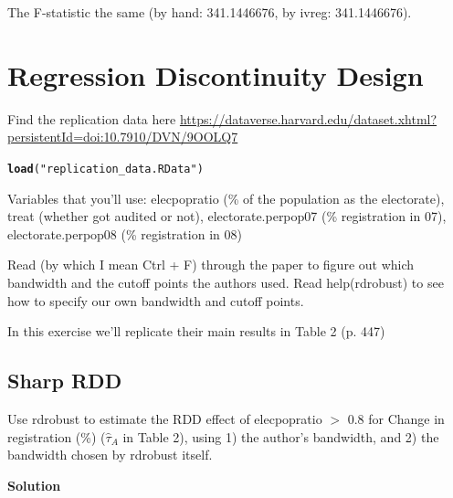 \documentclass{article}\usepackage[]{graphicx}\usepackage[]{color}
\makeatletter
\newcommand{\hlstr}[1]{\textcolor[rgb]{0.192,0.494,0.8}{#1}}%
\newcommand{\hlstd}[1]{\textcolor[rgb]{0.345,0.345,0.345}{#1}}%
\newcommand{\hlkwd}[1]{\textcolor[rgb]{0.737,0.353,0.396}{\textbf{#1}}}%
\newenvironment{kframe}{%
 \def\at@end@of@kframe{}%
 \ifinner\ifhmode%
  \def\at@end@of@kframe{\end{minipage}}%
  \begin{minipage}{\columnwidth}%
 \fi\fi%
 \def\FrameCommand##1{\hskip\@totalleftmargin \hskip-\fboxsep
 \colorbox{shadecolor}{##1}\hskip-\fboxsep
     \hskip-\linewidth \hskip-\@totalleftmargin \hskip\columnwidth}%
 \MakeFramed {\advance\hsize-\width
   \@totalleftmargin\z@ \linewidth\hsize
   \@setminipage}}%
 {\par\unskip\endMakeFramed%
 \at@end@of@kframe}
\newenvironment{knitrout}{}{} %
\makeatother
\begin{document}
The F-statistic the same (by hand: 341.1446676, by ivreg: 341.1446676).

\section{Regression Discontinuity Design}

Find the replication data here \url{https://dataverse.harvard.edu/dataset.xhtml?persistentId=doi:10.7910/DVN/9OOLQ7}

\begin{knitrout}
\color{fgcolor}\begin{kframe}
\begin{alltt}
\hlkwd{load}\hlstd{(}\hlstr{"replication_data.RData"}\hlstd{)}
\end{alltt}
\end{kframe}
\end{knitrout}

Variables that you'll use: elecpopratio (\% of the population as the electorate), treat (whether got audited or not), electorate.perpop07 (\% registration in 07), electorate.perpop08 (\% registration in 08)

Read (by which I mean Ctrl + F) through the paper to figure out which bandwidth and the cutoff points the authors used. Read help(rdrobust) to see how to specify our own bandwidth and cutoff points.

In this exercise we'll replicate their main results in Table 2 (p. 447)

\subsection{Sharp RDD}

Use rdrobust to estimate the RDD effect of elecpopratio $>$ 0.8 for Change in registration (\%) ($\hat\tau_A$ in Table 2), using 1) the author's bandwidth, and 2) the bandwidth chosen by rdrobust itself.

\textbf{Solution}
\end{document}
